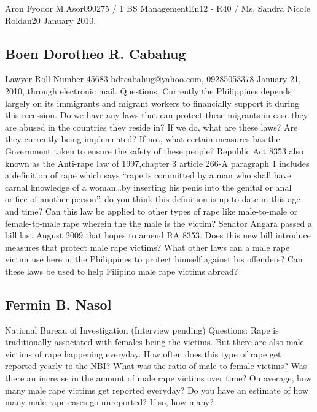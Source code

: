 \documentclass[letterpaper]{article}
\begin{document}
\begin{mla}{Aron Fyodor M.}{Asor}{090275 / 1 BS Management}{En12 - R40 / Ms. Sandra Nicole Roldan}{20 January 2010}{. }
	\subsection{Boen Dorotheo R. Cabahug}	
	\begin{outline}
		\1 Lawyer 
		\1Roll Number 45683
		\1 bdrcabahug@yahoo.com, 09285053378
		\1 January 21, 2010, through electronic mail.
		\1 Questions:
			\2 Currently the Philippines depends largely on its immigrants and migrant workers  to financially support it during this recession. Do we have any laws that can protect these migrants in case they are abused in the countries they reside in?
			\3 If we do, what are these laws? Are they currently being implemented?
			\3 If not, what certain measures has the Government taken to ensure the safety of these people?
			\2 Republic Act 8353 also known as the Anti-rape law of 1997,chapter 3 article 266-A paragraph 1 includes a definition of rape which says ``rape is committed by a man who shall have carnal knowledge of a woman\ldots by inserting his penis into the genital or anal orifice of another person''. do you think this definition is up-to-date in this age and time?
			\3 Can this law be applied to other types of rape like male-to-male or female-to-male rape wherein the the male is the victim?
			\3 Senator Angara passed a bill last August 2009 that hopes to amend RA 8353. Does this new bill introduce measures that protect male rape victims?
			\2 What other laws can a male rape victim use here in the Philippines to protect himself against his offenders?
			\3 Can these laws be used to help Filipino male rape victims abroad?
	\end{outline}
	\subsection{Fermin B. Nasol}
	\begin{outline}
		\1 National Bureau of Investigation
		\1 09278705223
		\1 (Interview pending)
		\1 Questions:
			\2 Rape is traditionally associated with females being the victims. But there are also male victims of rape happening everyday. How often does this type of rape get reported yearly to the NBI? What was the ratio of male to female victims?
			\3 Was there an increase in the amount of male rape victims over time?
			\3 On average, how many male rape victims get reported everyday?
			\4 Do you have an estimate of how many male rape cases go unreported? If so, how many?
	\end{outline}


\end{mla}
\end{document}
